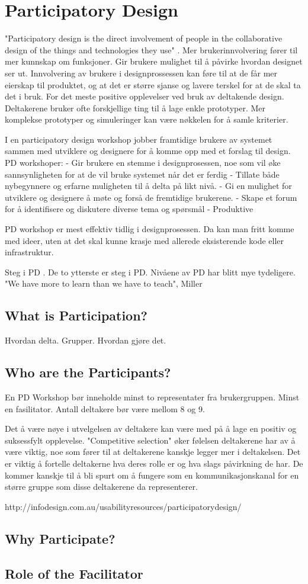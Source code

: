 \section{Participatory Design}
"Participatory design is the direct involvement of people in the collaborative design of the things and technologies they use" \cite{mmi}. Mer brukerinnvolvering fører til mer kunnskap om funksjoner. Gir brukere mulighet til å påvirke hvordan designet ser ut. Innvolvering av brukere i designprossessen kan føre til at de får mer eierskap til produktet, og at det er større sjanse og lavere terskel for at de skal ta det i bruk. For det meste positive opplevelser ved bruk av deltakende design. Deltakerene bruker ofte forskjellige ting til å lage enkle prototyper. Mer komplekse prototyper og simuleringer kan være nøkkelen for å samle kriterier. 

I en participatory design workshop jobber framtidige brukere av systemet sammen med utviklere og designere for å komme opp med et forslag til design. 
PD workshoper:
- Gir brukere en stemme i designprosessen, noe som vil øke sannsynligheten for at de vil bruke systemet når det er ferdig
- Tillate både nybegynnere og erfarne muligheten til å delta på likt nivå. 
- Gi en mulighet for utviklere og designere å møte og forså de fremtidige brukerene. 
- Skape et forum for å identifisere og diskutere diverse tema og spørsmål
- Produktive

PD workshop er mest effektiv tidlig i designprosessen. Da kan man fritt komme med ideer, uten at det skal kunne krasje med allerede eksisterende kode eller infrastruktur. 

Steg i PD \cite{druin2002role}. De to ytterste er steg i PD. Nivåene av PD har blitt mye tydeligere. 
"We have more to learn than we have to teach", Miller
\subsection{What is Participation?}
Hvordan delta. Grupper. Hvordan gjøre det. 
\subsection{Who are the Participants?}
En PD Workshop bør inneholde minst to representater fra brukergruppen. Minst en fasilitator. Antall deltakere bør være mellom 8 og 9. 

Det å være nøye i utvelgelsen av deltakere kan være med på å lage en positiv og suksessfylt opplevelse. "Competitive selection" øker følelsen deltakerene har av å være viktig, noe som fører til at deltakerene kanskje legger mer i deltakelsen. Det er viktig å fortelle deltakerne hva deres rolle er og hva slags påvirkning de har. De kommer kanskje til å bli spurt om å fungere som en kommunikasjonskanal for en større gruppe som disse deltakerene da representerer. 

http://infodesign.com.au/usabilityresources/participatorydesign/
\subsection{Why Participate?}
\subsection{Role of the Facilitator}
